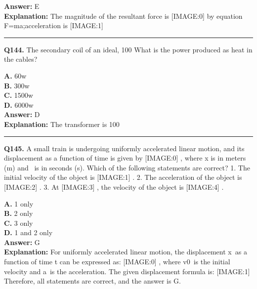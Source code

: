 \documentclass[12pt]{article}
\begin{document}
\textbf{Answer:} E \\
\textbf{Explanation:} The magnitude of the resultant force is
[IMAGE:0]
by equation
F=ma;acceleration is
[IMAGE:1]

\hrule
\vspace{1em}


\noindent
\textbf{Q144.} The secondary coil of an ideal, 100%
What is the power produced as heat in the cables?



\textbf{A.} 60w \\
\textbf{B.} 300w \\
\textbf{C.} 1500w \\
\textbf{D.} 6000w \\

\textbf{Answer:} D \\
\textbf{Explanation:} The transformer is 100%

\hrule
\vspace{1em}


\noindent
\textbf{Q145.} A small train is undergoing uniformly accelerated linear motion, and its displacement as a function of time is given by
[IMAGE:0]
, where x is in meters (m) and  is in seconds (s). Which of the following statements are correct?
1.
The initial velocity of the object is
[IMAGE:1]
.
2.
The acceleration of the object is
[IMAGE:2]
.
3.
At
[IMAGE:3]
, the velocity of the object is
[IMAGE:4]
.



\textbf{A.} 1 only \\
\textbf{B.} 2 only \\
\textbf{C.} 3 only \\
\textbf{D.} 1 and 2 only \\

\textbf{Answer:} G \\
\textbf{Explanation:} For uniformly accelerated linear motion, the displacement x as a function of time t can be expressed as:
[IMAGE:0]
, where v0 is the initial velocity and a is the acceleration.
The given displacement formula is:
[IMAGE:1]
Therefore, all statements are correct, and the answer is G.
\end{document}

